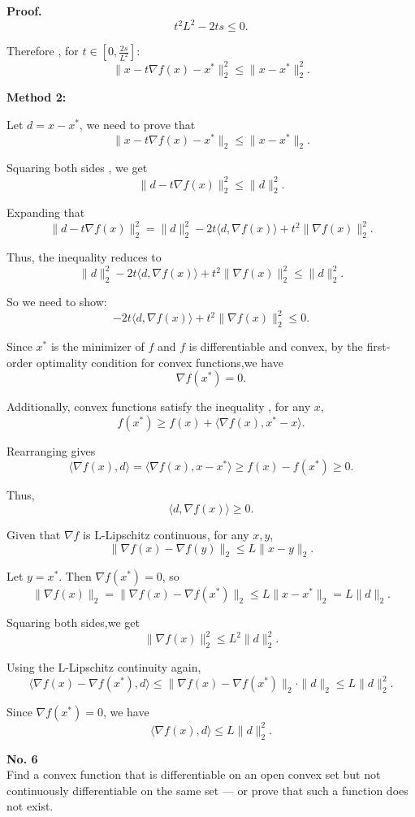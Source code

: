 \documentclass[a4paper, 11pt]{article}
\newenvironment{problem}[2][No.]
    { \begin{mdframed}[backgroundcolor=gray!5] \textbf{#1 #2} \\}
    {  \end{mdframed}}
\newenvironment{solution}
    {\textbf{Proof.}}
    {}
\begin{document}
\begin{solution}
$$
t^2 L^2 - 2ts \leq 0.
$$

Therefore , for \( t \in [0, \frac{2s}{L^2}]\): 
$$
\|x - t\nabla f(x) - x^*\|_2^2 \leq \|x - x^*\|_2^2.
$$ 

	\textbf{Method 2:}
	
	Let \(d = x - x^*\),  we need to prove that 
	$$\| x - t\nabla f(x) - x^* \|_2 \leq \| x - x^* \|_2.$$  
	
	Squaring both sides , we get  
	$$\| d - t\nabla f(x) \|_2^2 \leq \| d \|_2^2.$$  
	
	Expanding that 
	$$\| d - t\nabla f(x) \|_2^2 = \| d \|_2^2 - 2t\langle d, \nabla f(x) \rangle + t^2\|\nabla f(x)\|_2^2.$$  
	
	Thus, the inequality reduces to
	$$\| d \|_2^2 - 2t\langle d, \nabla f(x) \rangle + t^2\|\nabla f(x)\|_2^2 \leq \| d \|_2^2.$$  

	So we need to show:  
	$$-2t\langle d, \nabla f(x) \rangle + t^2\|\nabla f(x)\|_2^2 \leq 0 \tag{1}.$$  
	
	Since \(x^*\) is the minimizer of \(f\) and \(f\) is differentiable and convex, by the first-order optimality condition for convex functions,we have  
	$$\nabla f(x^*) = 0.$$  
	
	Additionally, convex functions satisfy the inequality , for any \(x\),  
	$$f(x^*) \geq f(x) + \langle \nabla f(x), x^* - x \rangle.$$ 
	 
	Rearranging gives 
	$$\langle \nabla f(x), d \rangle = \langle \nabla f(x), x - x^* \rangle \geq f(x) - f(x^*) \geq 0.$$ 
	
	Thus, $$\langle d, \nabla f(x) \rangle \geq 0.$$
	
	Given that \(\nabla f\) is L-Lipschitz continuous, for any \(x, y\),
	$$\|\nabla f(x) - \nabla f(y)\|_2 \leq L\|x - y\|_2.$$  
	
	Let \(y = x^*\). Then \(\nabla f(x^*) = 0\), so
	$$\|\nabla f(x)\|_2 = \|\nabla f(x) - \nabla f(x^*)\|_2 \leq L\|x - x^*\|_2 = L\|d\|_2.$$
	  
	Squaring both sides,we get 
	$$\|\nabla f(x)\|_2^2 \leq L^2\|d\|_2^2 \tag{2}.$$  
	 
	Using the L-Lipschitz continuity again,
	$$\langle \nabla f(x) - \nabla f(x^*), d \rangle \leq \|\nabla f(x) - \nabla f(x^*)\|_2 \cdot \|d\|_2 \leq L\|d\|_2^2.$$  
	
	Since \(\nabla f(x^*) = 0\), we have
	$$\langle \nabla f(x), d \rangle \leq L\|d\|_2^2 \tag{3}.$$  
\end{solution}

\begin{problem}{6}
	Find a convex function that is differentiable on an open convex set but not continuously differentiable on the same set --- or prove that such a function does not exist.
	
\end{problem}
\end{document}
